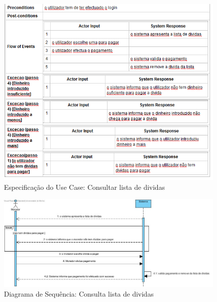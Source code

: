 \begin{figure}[htb!]
	\centering
	\includegraphics[scale=0.7]{imagens/Especificacoes/consultarlistadedividas}  
	\caption{Especificação do Use Case: Consultar lista de dividas}  
\end{figure}


\begin{figure}[htb!]
	\centering
	\includegraphics[scale=0.6]{imagens/diagramaSeq/ConsultaListaDividas}  
	\caption{Diagrama de Sequência: Consulta lista de dividas}  
\end{figure}


\newpage

